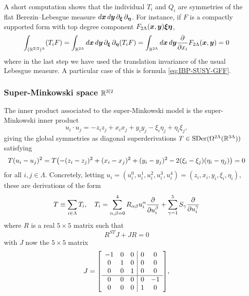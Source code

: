 \documentclass[11pt,a4paper]{article}
\let\originalleft\left
\let\originalright\right
\renewcommand{\left}{\mathopen{}\mathclose\bgroup\originalleft}
\renewcommand{\right}{\aftergroup\egroup\originalright}
\begin{document}
A short computation shows that the individual $T_i$ and $Q_i$ are
symmetries of the flat Berezin--Lebesgue measure
$d\boldsymbol{x}\,d\boldsymbol{y}\,\partial_{\boldsymbol{\xi}}\,\partial_{\boldsymbol{\eta}}$. For
instance, if $F$ is a compactly supported form with top degree
component $F_{2\Lambda}(\boldsymbol{x},\boldsymbol{y})\boldsymbol{\xi}\boldsymbol{\eta}$,
\begin{equation}
\int_{(\mathbb{R}^{2|2})^\Lambda} (T_i F) = \int_{\mathbb{R}^{2\Lambda}}d\boldsymbol{x}\,d\boldsymbol{y}\,\partial_{\boldsymbol{\xi}}\,\partial_{\boldsymbol{\eta}} (T_i F) = \int_{\mathbb{R}^{2\Lambda}}d\boldsymbol{x}\,d\boldsymbol{y} \frac{\partial }{\partial x_i}F_{2\Lambda}(\boldsymbol{x},\boldsymbol{y}) = 0
\end{equation}
where in the last step we have used the translation invariance of the usual Lebesgue measure. A particular case of this is formula \eqref{eq:IBP-SUSY-GFF}.

\subsubsection{Super-Minkowski space $\mathbb{R}^{3|2}$}
\label{sec:h22iso}
The inner product associated to the super-Minkowski model is the super-Minkowski inner product
\begin{equation}
u_i \cdot u_j = -z_iz_j + x_ix_j + y_iy_j - \xi_i\eta_j + \eta_i\xi_j,
\end{equation}
giving the global symmetries as diagonal superderivations
$T\in \mathrm{SDer}(\Omega^{2\Lambda}(\mathbb{R}^{3\Lambda}))$ satisfying
\begin{equation}
T(u_i - u_j)^2 = T\left(-(z_i-z_j)^{2} + (x_i-x_j)^2 + (y_i-y_j)^2 - 2(\xi_i-\xi_j)(\eta_i-\eta_j) \right) = 0
\end{equation}
for all $i,j\in \Lambda$.
Concretely, letting $u_i = (u_i^0, u_i^1,u_i^2,u_i^3,u_i^4) = (z_i,x_i,y_i,\xi_i,\eta_i)$, these are derivations of the form
\begin{equation}
T \equiv \sum_{i\in \Lambda}T_i,\quad T_i = \sum_{\alpha,\beta = 0}^4 R_{\alpha\beta} u^\alpha_i \frac{\partial }{\partial u^\beta_i} + \sum_{\gamma = 1}^{5}S_{\gamma}\frac{\partial }{\partial u^\gamma_i} 
\end{equation}
where $R$ is a real $5\times 5$ matrix such that
\begin{equation}
R^{ST}J + JR = 0
\end{equation}
with $J$ now the $5\times 5$ matrix
\begin{equation}
J = \left[\begin{array}{ccc|cc}
-1 & 0 & 0 & 0 &0\\
0 & 1 & 0 & 0 &0\\
0 &0 & 1 & 0 & 0 \\\hline
0 &0 & 0 & 0 & -1\\
0 &0 & 0 & 1 & 0
\end{array}\right],
\end{equation}
\end{document}
